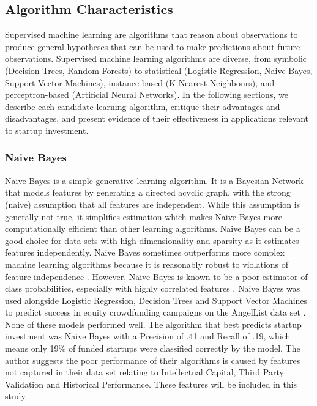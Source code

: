 \documentclass[../thesis/thesis.tex]{subfiles}
\begin{document}
\begin{refsection}
\subsection{Algorithm Characteristics}

Supervised machine learning are algorithms that reason about observations to produce general hypotheses that can be used to make predictions about future observations. Supervised machine learning algorithms are diverse, from symbolic (Decision Trees, Random Forests) to statistical (Logistic Regression, Naive Bayes, Support Vector Machines), instance-based (K-Nearest Neighbours), and perceptron-based (Artificial Neural Networks). In the following sections, we describe each candidate learning algorithm, critique their advantages and disadvantages, and present evidence of their effectiveness in applications relevant to startup investment.

\subsubsection{Naive Bayes}

Naive Bayes is a simple generative learning algorithm. It is a Bayesian Network that models features by generating a directed acyclic graph, with the strong (naive) assumption that all features are independent. While this assumption is generally not true, it simplifies estimation which makes Naive Bayes more computationally efficient than other learning algorithms. Naive Bayes can be a good choice for data sets with high dimensionality and sparsity as it estimates features independently. Naive Bayes sometimes outperforms more complex machine learning algorithms because it is reasonably robust to violations of feature independence \cite{kotsiantis2007}. However, Naive Bayes is known to be a poor estimator of class probabilities, especially with highly correlated features \cite{niculescu2005}. Naive Bayes was used alongside Logistic Regression, Decision Trees and Support Vector Machines to predict success in equity crowdfunding campaigns on the AngelList data set \cite{beckwith2016}. None of these models performed well. The algorithm that best predicts startup investment was Naive Bayes with a Precision of .41 and Recall of .19, which means only 19\% of funded startups were classified correctly by the model. The author suggests the poor performance of their algorithms is caused by features not captured in their data set relating to Intellectual Capital, Third Party Validation and Historical Performance. These features will be included in this study.


\end{refsection}
\end{document}

